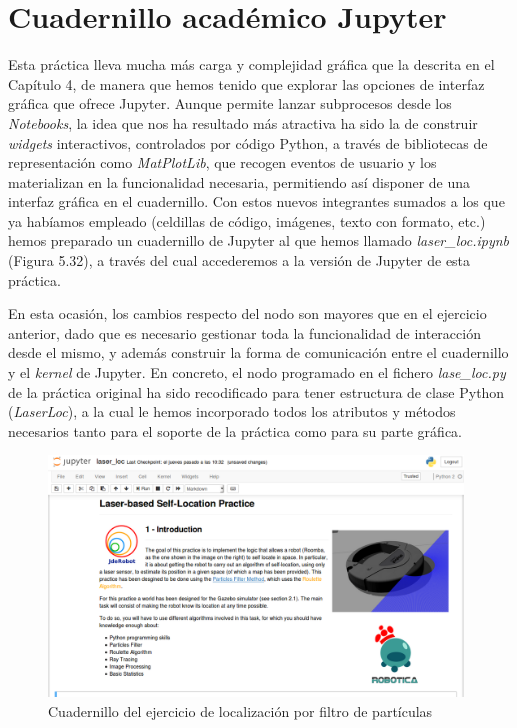 \section{Cuadernillo académico Jupyter}
Esta práctica lleva mucha más carga y complejidad gráfica que la descrita en el Capítulo 4, de manera que hemos tenido que explorar las opciones de interfaz gráfica que ofrece Jupyter. Aunque permite lanzar subprocesos desde los \textit{Notebooks}, la idea que nos ha resultado más atractiva ha sido la de construir \textit{widgets} interactivos, controlados por código Python, a través de bibliotecas de representación como \textit{MatPlotLib}, que recogen eventos de usuario y los materializan en la funcionalidad necesaria, permitiendo así disponer de una interfaz gráfica en el cuadernillo. Con estos nuevos integrantes sumados a los que ya habíamos empleado (celdillas de código, imágenes, texto con formato, etc.) hemos preparado un cuadernillo de Jupyter al que hemos llamado \textit{laser\_loc.ipynb} (Figura 5.32), a través del cual accederemos a la versión de Jupyter de esta práctica. 

En esta ocasión, los cambios respecto del nodo son mayores que en el ejercicio anterior, dado que es necesario gestionar toda la funcionalidad de interacción desde el mismo, y además construir la forma de comunicación entre el cuadernillo y el \textit{kernel} de Jupyter. En concreto, el nodo programado en el fichero \textit{lase\_loc.py} de la práctica original ha sido recodificado para tener estructura de clase Python (\textit{LaserLoc}), a la cual le hemos incorporado todos los atributos y métodos necesarios tanto para el soporte de la práctica como para su parte gráfica. 

\begin{figure}[H]
	\begin{center}
		\includegraphics[width=0.98\textwidth]{figures/laserlocjupyter.png}
		\caption{Cuadernillo del ejercicio de localización por filtro de partículas}
		\label{fig.laserlocjupyter}
		\end{center}
\end{figure}

